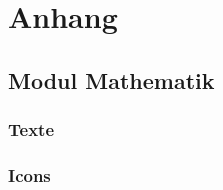 \setcounter{section}{0}
\setcounter{subsection}{0}
\renewcommand*\thesection{\Alph{section}}

\chapter{Anhang}
\section{Modul Mathematik}
\subsection{Texte}
\subsection{Icons}
